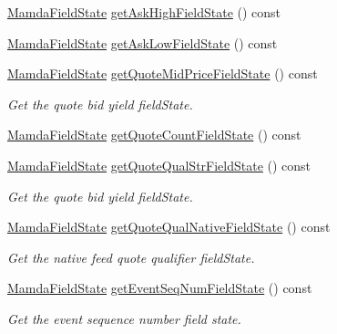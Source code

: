 \begin{CompactItemize}
\item 
\hyperlink{namespaceWombat_93aac974f2ab713554fd12a1fa3b7d2a}{Mamda\-Field\-State} \hyperlink{classWombat_1_1MamdaQuoteListener_eeafa59d487408997b68812a8c6686e2}{get\-Ask\-High\-Field\-State} () const 
\item 
\hyperlink{namespaceWombat_93aac974f2ab713554fd12a1fa3b7d2a}{Mamda\-Field\-State} \hyperlink{classWombat_1_1MamdaQuoteListener_eaf6f8cbb1ca477e3d4ffedb4753e105}{get\-Ask\-Low\-Field\-State} () const 
\item 
\hyperlink{namespaceWombat_93aac974f2ab713554fd12a1fa3b7d2a}{Mamda\-Field\-State} \hyperlink{classWombat_1_1MamdaQuoteListener_19d19b0f64db3586e14b88f4a502ecbf}{get\-Quote\-Mid\-Price\-Field\-State} () const 
\begin{CompactList}\small\item\em Get the quote bid yield field\-State. \item\end{CompactList}\item 
\hyperlink{namespaceWombat_93aac974f2ab713554fd12a1fa3b7d2a}{Mamda\-Field\-State} \hyperlink{classWombat_1_1MamdaQuoteListener_3b4f752b2a7b92e5177b1d19abc1606e}{get\-Quote\-Count\-Field\-State} () const 
\item 
\hyperlink{namespaceWombat_93aac974f2ab713554fd12a1fa3b7d2a}{Mamda\-Field\-State} \hyperlink{classWombat_1_1MamdaQuoteListener_90a6df719e3f391f19edf4796f947b35}{get\-Quote\-Qual\-Str\-Field\-State} () const 
\begin{CompactList}\small\item\em Get the quote bid yield field\-State. \item\end{CompactList}\item 
\hyperlink{namespaceWombat_93aac974f2ab713554fd12a1fa3b7d2a}{Mamda\-Field\-State} \hyperlink{classWombat_1_1MamdaQuoteListener_9c5a520a83919f48b66dc8989d509c4c}{get\-Quote\-Qual\-Native\-Field\-State} () const 
\begin{CompactList}\small\item\em Get the native feed quote qualifier field\-State. \item\end{CompactList}\item 
\hyperlink{namespaceWombat_93aac974f2ab713554fd12a1fa3b7d2a}{Mamda\-Field\-State} \hyperlink{classWombat_1_1MamdaQuoteListener_14657763833e473324025f3093119656}{get\-Event\-Seq\-Num\-Field\-State} () const 
\begin{CompactList}\small\item\em Get the event sequence number field state. \item\end{CompactList}\item 

\end{CompactItemize}
